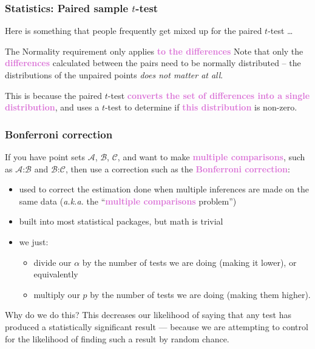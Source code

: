 \documentclass{beamer}
\newcommand{\aka}{\textit{a.k.a.}\xspace}
\newcommand{\key}[1]{\textcolor{orchid}{{\bf #1}}}
\begin{document}
\begin{frame}
\frametitle{Statistics: Paired sample $t$-test}
Here is something that people frequently get mixed up for
the paired $t$-test \dots

\begin{block}{The Normality requirement only applies \key{to the differences}}
Note that only the \key{differences} calculated between the pairs
need to be normally distributed -- the distributions of the
unpaired points \emph{does not matter at all}.

This is because the paired $t$-test \key{converts the set of differences
into a single distribution}, and uses a $t$-test to determine if \key{this
distribution} is non-zero.
\end{block}
\end{frame}

\begin{frame}
\frametitle{Bonferroni correction}
If you have point sets
$\mathcal{A}$,
$\mathcal{B}$,
$\mathcal{C}$,
and want to make \key{multiple comparisons}, such as
$\mathcal{A}$:$\mathcal{B}$ and
$\mathcal{B}$:$\mathcal{C}$, then
use a correction such as the \key{Bonferroni correction}:
\begin{itemize}
\item used to correct the estimation done when multiple inferences
		are made on the same data (\aka the ``\key{multiple comparisons} problem'')
\pause
\item built into most statistical packages, but math is trivial
\item we just:
	\begin{itemize}
	\item divide our $\alpha$ by the number of tests we are doing (making it lower), or equivalently
	\pause
	\item multiply our $p$ by the number of tests we are doing (making them higher).
	\end{itemize}
\end{itemize}
\pause
\begin{block}{Why do we do this?}
This decreases our likelihood of saying that any test has produced
		a statistically significant result --- because we are attempting
		to control for the likelihood of finding such a result by
		random chance.
\end{block}
\end{frame}
\end{document}
